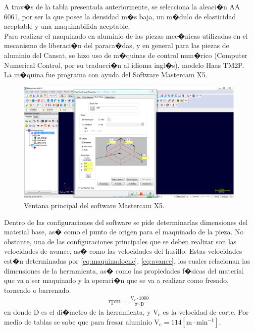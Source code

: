 \documentclass[10pt,a4paper]{book}
\begin{document}
A trav�s de la tabla presentada anteriormente, se selecciona la aleaci�n AA 6061, por ser la que posee la densidad m�s baja,  un m�dulo de elasticidad aceptable y una maquinabilida aceptable.\\
Para realizar el maquinado en aluminio de las piezas mec�nicas utilizadas en el mecanismo de liberaci�n del paraca�das, y en general para  las piezas de aluminio del Cansat, se hizo uso de m�quinas de control num�rico (Computer Numerical Control, por su traducci�n al idioma ingl�s), modelo Haas TM2P. La m�quina  fue programa con ayuda del Software Mastercam X5. 
\begin{figure}[H]
\begin{center}
\includegraphics[scale=0.35]{Imagenes/ConfiguracionCNC.png}
\caption{Ventana principal del software Mastercam X5. \label{img:ConfiguracionCNC}}
\end{center}
\end{figure} 
Dentro de las configuraciones del software se pide determinarlas dimensiones del material base, as� como el punto de origen para el maquinado de la pieza. No obstante, una de las configuraciones principales que se deben realizar son las velocidades de avance, as� como las velocidades del husillo. Estas velocidades est�n determinadas por \ref{eq:maquinadocnc}, \ref{eq:avance}, los cuales relacionan las dimensiones de la herramienta, as� como las propiedades f�sicas del material que va a ser maquinado y la operaci�n que se va a realizar como fresado, torneado o barrenado.\\
\begin{align}
\label{eq:maquinadocnc}
\text{rpm} =  \frac{\text{V}_{\text{c}} \cdot 1000}{ \pi  \cdot \text{D}}
\end{align}
en donde D es el di�metro de la herramienta, y $\text{V}_{\text{c}}$ es la velocidad de corte. Por medio de tablas se sabe que para fresar aluminio $\text{V}_{\text{c}}=114 \left[ \text{m} \cdot \text{min}^{-1}\right]$.
\end{document}
